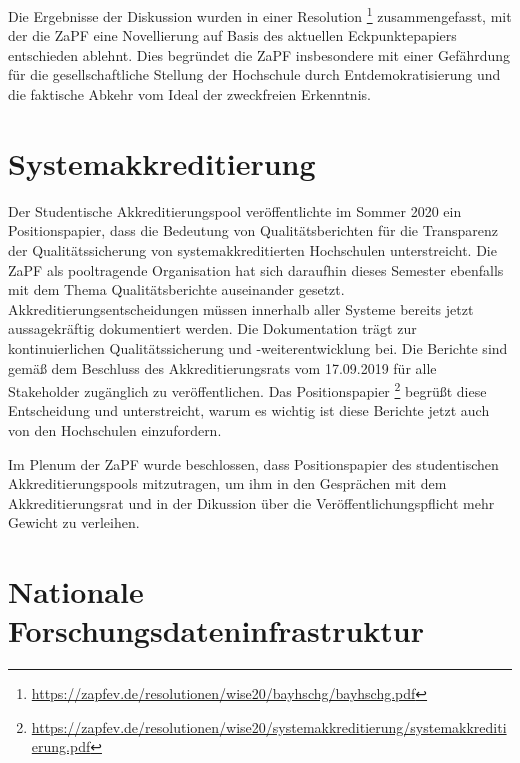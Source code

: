\documentclass{scrartcl}
\begin{document}
Die Ergebnisse der Diskussion wurden in einer Resolution \footnote{\url{https://zapfev.de/resolutionen/wise20/bayhschg/bayhschg.pdf}} zusammengefasst, mit der die ZaPF eine Novellierung auf Basis des aktuellen Eckpunktepapiers entschieden ablehnt. Dies begründet die ZaPF insbesondere mit einer Gefährdung für die gesellschaftliche Stellung der Hochschule durch Entdemokratisierung und die faktische Abkehr vom Ideal der zweckfreien Erkenntnis.

\section*{Systemakkreditierung}

Der Studentische Akkreditierungspool veröffentlichte im Sommer 2020 ein Positionspapier, dass die Bedeutung von Qualitätsberichten für die Transparenz der Qualitätssicherung von systemakkreditierten Hochschulen unterstreicht. Die ZaPF als pooltragende Organisation hat sich daraufhin dieses Semester ebenfalls mit dem Thema Qualitätsberichte auseinander gesetzt. \\
Akkreditierungsentscheidungen müssen innerhalb aller Systeme bereits jetzt aussagekräftig dokumentiert werden. Die Dokumentation trägt zur kontinuierlichen Qualitätssicherung und -weiterentwicklung bei. Die Berichte sind gemäß dem Beschluss des Akkreditierungsrats vom 17.09.2019 für alle Stakeholder zugänglich zu veröffentlichen. Das Positionspapier \footnote{\url{https://zapfev.de/resolutionen/wise20/systemakkreditierung/systemakkreditierung.pdf}} begrüßt diese Entscheidung und unterstreicht, warum es wichtig ist diese Berichte jetzt auch von den Hochschulen einzufordern.

Im Plenum der ZaPF wurde beschlossen, dass Positionspapier des studentischen Akkreditierungspools mitzutragen, um ihm in den Gesprächen mit dem Akkreditierungsrat und in der Dikussion über die Veröffentlichungspflicht mehr Gewicht zu verleihen.

\section*{Nationale Forschungsdateninfrastruktur}
\end{document}
